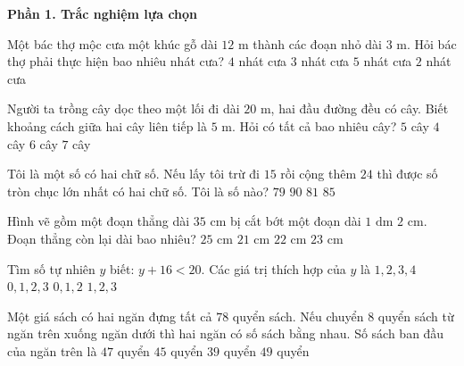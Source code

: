 \textbf{Phần 1. Trắc nghiệm lựa chọn}

\begin{ex} %
Một bác thợ mộc cưa một khúc gỗ dài $12\text{ m}$ thành các đoạn nhỏ dài $3\text{ m}$. Hỏi bác thợ phải thực hiện bao nhiêu nhát cưa?
\choice
{$4$ nhát cưa}
{\True $3$ nhát cưa}
{$5$ nhát cưa}
{$2$ nhát cưa}
\end{ex}

\begin{ex} %
Người ta trồng cây dọc theo một lối đi dài $20\text{ m}$, hai đầu đường đều có cây. Biết khoảng cách giữa hai cây liên tiếp là $5\text{ m}$. Hỏi có tất cả bao nhiêu cây?
\choice
{\True $5$ cây}
{$4$ cây}
{$6$ cây}
{$7$ cây}
\end{ex}

\begin{ex} %
Tôi là một số có hai chữ số. Nếu lấy tôi trừ đi $15$ rồi cộng thêm $24$ thì được số tròn chục lớn nhất có hai chữ số. Tôi là số nào?
\choice
{$79$}
{$90$}
{\True $81$}
{$85$}
\end{ex}

\begin{ex} %
Hình vẽ gồm một đoạn thẳng dài $35\text{ cm}$ bị cắt bớt một đoạn dài $1\text{ dm } 2\text{ cm}$. Đoạn thẳng còn lại dài bao nhiêu?
\choice
{$25\text{ cm}$}
{$21\text{ cm}$}
{$22\text{ cm}$}
{\True $23\text{ cm}$}
\end{ex}

\begin{ex} %
Tìm số tự nhiên $y$ biết: $y + 16 < 20$. Các giá trị thích hợp của $y$ là
\choice
{$1, 2, 3, 4$}
{\True $0, 1, 2, 3$}
{$0, 1, 2$}
{$1, 2, 3$}
\end{ex}

\begin{ex} %
Một giá sách có hai ngăn đựng tất cả $78$ quyển sách. Nếu chuyển $8$ quyển sách từ ngăn trên xuống ngăn dưới thì hai ngăn có số sách bằng nhau. Số sách ban đầu của ngăn trên là
\choice
{\True $47$ quyển}
{$45$ quyển}
{$39$ quyển}
{$49$ quyển}
\end{ex}

